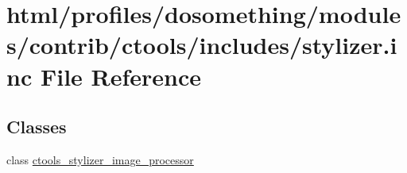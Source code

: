 \hypertarget{includes_2stylizer_8inc}{
\section{html/profiles/dosomething/modules/contrib/ctools/includes/stylizer.inc File Reference}
\label{includes_2stylizer_8inc}
}
\subsection*{Classes}
\begin{DoxyCompactItemize}
\item 
class \hyperlink{classctools__stylizer__image__processor}{ctools\_\-stylizer\_\-image\_\-processor}
\end{DoxyCompactItemize}
